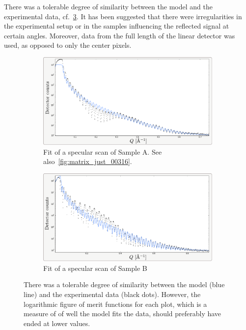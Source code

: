 \documentclass[10pt,twoside, b5paper,pdftex]{report}
\begin{document}
There was a tolerable degree of similarity between the model and the experimental data, cf.~\cref{fig:genx}. It has been suggested that there were irregularities in the experimental setup or in the samples influencing the reflected signal at certain angles. Moreover, data from the full length of the linear detector was used, as opposed to only the center pixels. %
\begin{figure}[htbp]
	\centering
	\begin{subfigure}{1.0\textwidth}
	  \includegraphics[width=\textwidth]{figures/genxA.pdf}
	  \caption{Fit of a specular scan of Sample A. See also~\cref{fig:matrix_just_00316}.}
	  \label{subfig:genxA}	
	\end{subfigure}
	\begin{subfigure}{1.0\textwidth}
	  \includegraphics[width=\textwidth]{figures/genxB.pdf}
	  \caption{Fit of a specular scan of Sample B}
	  \label{subfig:genxB}	
	\end{subfigure}
	\caption{There was a tolerable degree of similarity between the model (blue line) and the experimental data (black dots).%
However, the logarithmic figure of merit functions for each plot, which is a measure of of well the model fits the data, should preferably have ended at lower values. \label{fig:genx}}
\end{figure}
\end{document}
